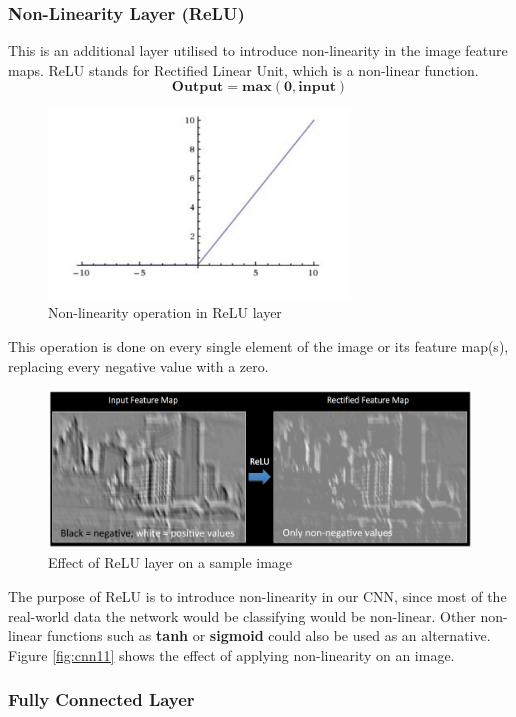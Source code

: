 \subsubsection*{Non-Linearity Layer (ReLU)}
\label{sect5_1_2_1a_c}
This is an additional layer utilised to introduce non-linearity in the image feature maps. ReLU stands for Rectified Linear Unit, which is a non-linear function.
\begin{equation}
\mathbf{Output = max(0, input)}
\end{equation}
\begin{figure}[h!]
\centering
\includegraphics[width=8cm]{figures/ReLu_Layer.png}
\caption{Non-linearity operation in ReLU layer}
\label{fig:cnn12}
\end{figure}\newline
This operation is done on every single element of the image or its feature map(s), replacing every negative value with a zero.
\begin{figure}[h!]
\centering
\includegraphics[width=12cm]{figures/Effect_ReLu.png}
\caption{Effect of ReLU layer on a sample image}
\label{fig:cnn13}
\end{figure}
The purpose of ReLU is to introduce non-linearity in our CNN, since most of the real-world data the network would be classifying would be non-linear. Other non-linear functions such as \textbf{tanh} or \textbf{sigmoid} could also be used as an alternative. Figure \ref{fig:cnn11} shows the effect of applying non-linearity on an image.

\subsubsection*{Fully Connected Layer}
\label{sect5_1_2_1a_d}

